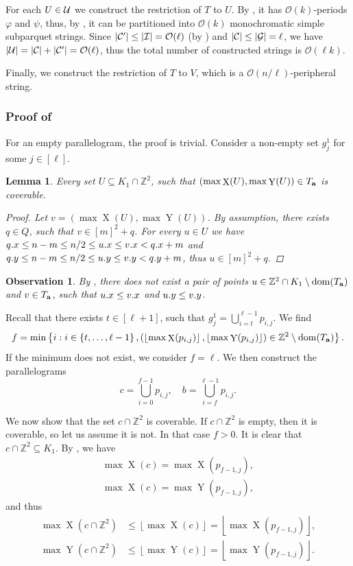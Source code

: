 \documentclass[11pt]{article}
\newcommand{\Z}{\mathbb{Z}}
\renewcommand{\O}{\mathcal{O}}
\renewcommand{\phi}{\varphi}
\newcommand{\set}[1]{\left\lbrace #1 \right\rbrace}
\newcommand{\floor}[1]{\left\lfloor #1 \right\rfloor}
\newcommand{\eq}[1]{\begin{align*} #1 \end{align*}}
\theoremstyle{plain}
\newtheorem{lemma}{Lemma}
\newtheorem{observation}{Observation}
\theoremstyle{definition}
\theoremstyle{remark}
\DeclareMathOperator*{\X}{X}
\DeclareMathOperator*{\Y}{Y}
\begin{document}
For each $U \in \mathcal{U}$ we construct the restriction of $T$ to $U$.
By , it has $\O(k)$-periods $\phi$ and $\psi$, thus, by , it can be partitioned into $\O(k)$ monochromatic simple subparquet strings.
Since $|\C'| \le |\I| = \O(\ell)$ (by ) and $|\mathcal{C}| \le |\mathcal{G}| = \ell$, we have $|\U| = |\C| + |\C'| = \O(\ell)$, thus the total number of constructed strings is $\O(\ell k)$.

Finally, we construct the restriction of $T$ to $V$, which is a $\O(n / \ell)$-peripheral string.


\subsubsection{Proof of } \label{parallelogram_split_lemma_proof}
For an empty parallelogram, the proof is trivial.
Consider a non-empty set $g^1_j$ for some $j \in [\ell]$.

\begin{lemma}\label{coverability_condition}
	Every set $U \subseteq K_1 \cap \Z^2$, such that $(\max \X(U), \max \Y(U)) \in \Ta$ is coverable.
	\begin{proof}
		Let $v = (\max \X(U), \max \Y(U))$.
		By assumption, there exists $q \in Q$, such that $v \in [m]^2 + q$.
		For every $u \in U$ we have
		$q.x \le n - m \le n / 2 \le u.x \le v.x < q.x + m$
		and $q.y \le n - m \le n / 2 \le u.y \le v.y < q.y + m$,
		thus $u \in [m]^2 + q$.
	\end{proof}
\end{lemma}

\begin{observation}\label{domination_lemma}
	By , there does not exist a pair of points $u \in \Z^2 \cap K_1 \setminus \d{\Ta}$ and $v \in T_\mathbf{a}$, such that $u.x \le v.x$ and $u.y \le v.y$. 
\end{observation}


Recall that there exists $t \in [\ell + 1]$, such that
$ g^1_j = \bigcup_{i = t}^{\ell - 1} p_{i, j}.$
We find 
\[ f = \min\set{i : i \in \set{t, \dots, \ell - 1}, (\floor{\max \X(p_{i, j})}, \floor{\max \Y(p_{i, j})}) \in \Z^2 \setminus \d{\Ta}}.\]
If the minimum does not exist, we consider $f = \ell$.
We then construct the parallelograms
\[c = \bigcup_{i = 0}^{f - 1} p_{i, j}, \quad b = \bigcup_{i = f}^{\ell - 1} p_{i, j}.\]

We now show that the set $c \cap \Z^2$ is coverable.
If $c \cap \Z^2$ is empty, then it is coverable, so let us assume it is not.
In that case $f > 0$.
It is clear that $c \cap \Z^2 \subseteq K_1$.
By , we have 
\eq{
\max \X(c) = \max \X(p_{f - 1, j}), \\
\max \X(c) = \max \Y(p_{f - 1, j}),
}
and thus
\eq{
	\max \X(c \cap \Z^2) &\le \floor{\max \X(c)} = \floor{\max \X(p_{f - 1, j})}, \\
	\max \Y(c \cap \Z^2) &\le \floor{\max \Y(c)} = \floor{\max \Y(p_{f - 1, j})}.
}
\end{document}
